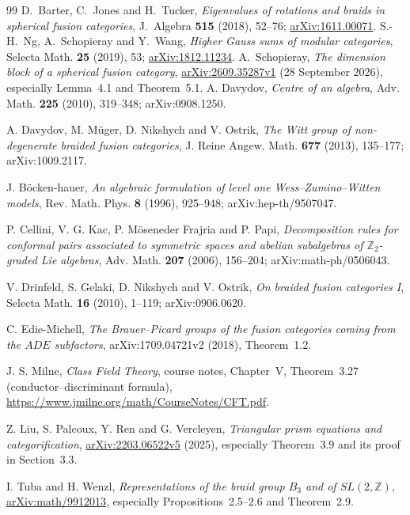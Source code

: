 \begin{thebibliography}{99}
D.~Barter, C.~Jones and H.~Tucker,
\emph{Eigenvalues of rotations and braids in spherical fusion categories},
J.~Algebra \textbf{515} (2018), 52--76;
\href{https://arxiv.org/abs/1611.00071}{arXiv:1611.00071}.
S.-H.~Ng, A.~Schopieray and Y.~Wang,
\emph{Higher Gauss sums of modular categories},
Selecta Math. \textbf{25} (2019), 53;
\href{https://arxiv.org/abs/1812.11234}{arXiv:1812.11234}.
A.~Schopieray, \emph{The dimension block of a spherical fusion category},
\href{https://arxiv.org/abs/2609.35287v1}{arXiv:2609.35287v1}
(28 September 2026), especially Lemma~4.1 and Theorem~5.1.
A. Davydov, \emph{Centre of an algebra}, Adv. Math. \textbf{225} (2010), 319--348; arXiv:0908.1250.

A. Davydov, M. M\"uger, D. Nikshych and V. Ostrik, \emph{The Witt group of non-degenerate braided fusion categories}, J. Reine Angew. Math. \textbf{677} (2013), 135--177; arXiv:1009.2117.

J. B\"ocken-hauer, \emph{An algebraic formulation of level one Wess--Zumino--Witten models}, Rev. Math. Phys. \textbf{8} (1996), 925--948; arXiv:hep-th/9507047.

P. Cellini, V. G. Kac, P. M\"oseneder Frajria and P. Papi, \emph{Decomposition rules for conformal pairs associated to symmetric spaces and abelian subalgebras of $\mathbb Z_2$-graded Lie algebras}, Adv. Math. \textbf{207} (2006), 156--204; arXiv:math-ph/0506043.

V. Drinfeld, S. Gelaki, D. Nikshych and V. Ostrik, \emph{On braided fusion categories I}, Selecta Math. \textbf{16} (2010), 1--119; arXiv:0906.0620.

C. Edie-Michell,
\emph{The Brauer--Picard groups of the fusion categories coming from the
$ADE$ subfactors}, arXiv:1709.04721v2 (2018), Theorem~1.2.

J. S. Milne, \emph{Class Field Theory}, course notes,
Chapter~V, Theorem~3.27 (conductor--discriminant formula),
\url{https://www.jmilne.org/math/CourseNotes/CFT.pdf}.

Z. Liu, S. Palcoux, Y. Ren and G. Vercleyen,
\emph{Triangular prism equations and categorification},
\href{https://arxiv.org/abs/2203.06522v5}{arXiv:2203.06522v5}
(2025), especially Theorem~3.9 and its proof in Section~3.3.

I. Tuba and H. Wenzl,
\emph{Representations of the braid group $B_3$ and of $SL(2,\mathbb Z)$},
\href{https://arxiv.org/abs/math/9912013}{arXiv:math/9912013},
especially Propositions~2.5--2.6 and Theorem~2.9.


\end{thebibliography}
